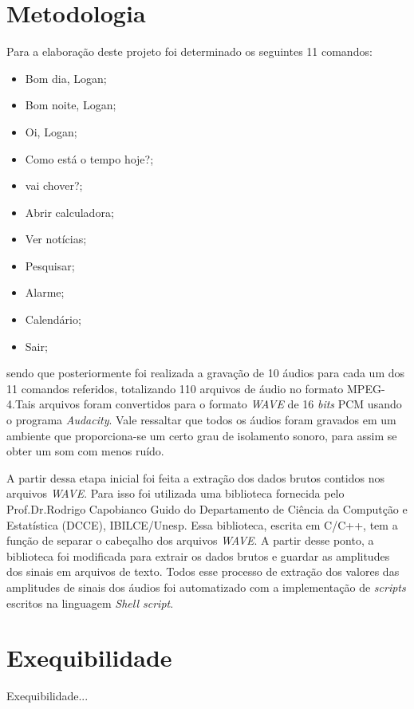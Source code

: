 \documentclass[a4paper,12pt,twoside,openright]{report}
\begin{document}
\section{Metodologia}
\par Para a elabora\c{c}\~{a}o deste projeto foi determinado os seguintes 11 comandos:
\begin{itemize}
	\item{}Bom dia, Logan;
	\item{}Bom noite, Logan;
	\item{}Oi, Logan;
	\item{}Como est\'{a} o tempo hoje?;
	\item{}vai chover?;
	\item{}Abrir calculadora;
	\item{}Ver not\'{i}cias;
	\item{}Pesquisar;
	\item{}Alarme;
	\item{}Calend\'{a}rio;
	\item{}Sair;	
\end{itemize}
sendo que posteriormente foi realizada a grava\c{c}\~{a}o de 10 \'{a}udios para cada um dos 11 comandos referidos, totalizando 110 arquivos de \'{a}udio no formato MPEG-4.Tais arquivos foram convertidos para o formato \textit{WAVE} de 16 \textit{bits} PCM usando o programa \textit{Audacity}. Vale ressaltar que todos os \'{a}udios foram gravados em um ambiente que proporciona-se um certo grau de isolamento sonoro, para assim se obter um som com menos ru\'{i}do.
\par A partir dessa etapa inicial foi feita a extra\c{c}\~{a}o dos dados brutos contidos nos arquivos \textit{WAVE}. Para isso foi utilizada uma biblioteca fornecida pelo Prof.Dr.Rodrigo Capobianco Guido do Departamento de Ci\^{e}ncia da Comput{\c c}\~{a}o e Estat\'{i}stica (DCCE), IBILCE/Unesp. Essa biblioteca, escrita em C/C++, tem a fun\c{c}\~{a}o de separar o cabe{\c c}alho dos arquivos \textit{WAVE}. A partir desse ponto, a biblioteca foi modificada para extrair os dados brutos e guardar as amplitudes dos sinais em arquivos de texto. Todos esse processo de extra{\c c}\~{a}o dos valores das amplitudes de sinais dos \'{a}udios foi automatizado com a implementa{\c c}\~{a}o de \textit{scripts} escritos na linguagem \textit{Shell script}.
\section{Exequibilidade}
\par Exequibilidade...
\end{document}
